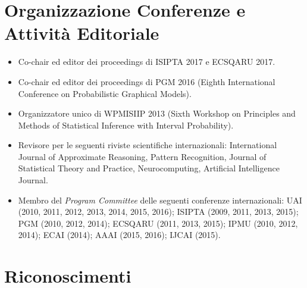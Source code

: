 \documentclass[12pt,a4paper]{moderncv}
\begin{document}
\section{Organizzazione Conferenze e Attivit\`a Editoriale}
\begin{itemize}
\item Co-chair ed editor dei proceedings di ISIPTA 2017 e ECSQARU 2017.
\item Co-chair ed editor dei proceedings di PGM 2016 (Eighth International Conference on Probabilistic Graphical Models).
\item Organizzatore unico di WPMISIIP 2013 (Sixth Workshop on Principles and Methods of Statistical Inference with Interval Probability).
\item Revisore per le seguenti riviste scientifiche internazionali: International Journal of Approximate Reasoning, Pattern Recognition, Journal of Statistical Theory and Practice, Neurocomputing, Artificial Intelligence Journal.
\item Membro del \emph{Program Committee} delle seguenti conferenze internazionali: UAI (2010, 2011, 2012, 2013, 2014, 2015, 2016); ISIPTA (2009, 2011, 2013, 2015); PGM (2010, 2012, 2014); ECSQARU (2011, 2013, 2015); IPMU (2010, 2012, 2014); ECAI (2014); AAAI (2015, 2016); IJCAI (2015).
\end{itemize}

\section{Riconoscimenti}
\end{document}
